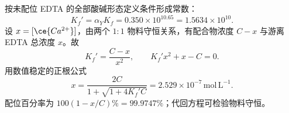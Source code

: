 按未配位 EDTA 的全部酸碱形态定义条件形成常数：
\[K_f'=\alpha_YK_f=0.350\times10^{10.65}=1.5634\times10^{10}.\]
设 $x=[\ce{Ca^{2+}}]$，由两个 $1\!:\!1$ 物料守恒关系，有配合物浓度 $C-x$ 与游离 EDTA 总浓度 $x$。故
\[K_f'=\frac{C-x}{x^2},\qquad K_f'x^2+x-C=0.\]
用数值稳定的正根公式
\[x=\frac{2C}{1+\sqrt{1+4K_f'C}}=2.529\times10^{-7}\,\mathrm{mol\,L^{-1}}.\]
配位百分率为 $100(1-x/C)\%=99.9747\%$；代回方程可检验物料守恒。
